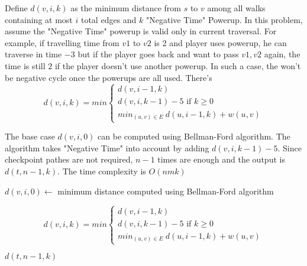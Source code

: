 \documentclass[12pt,a4paper]{article}
\begin{document}
Define $d(v,i,k)$ as the minimum distance from $s$ to $v$ among all walks containing at most $i$ total edges and $k$ "Negative Time" Powerup. In this problem, assume the "Negative Time" powerup is valid only in current traversal. For example, if travelling time from $v1$ to $v2$ is 2 and player uses powerup, he can traverse in time $-3$ but if the player goes back and want to pass $v1,v2$ again, the time is still $2$ if the player doesn't use another powerup. In such a case, the won't be negative cycle once the powerups are all used. There's
\begin{equation*}
	d(v,i,k) = min
	\begin{cases}
		d(v,i - 1,k) \\
		d(v,i,k - 1) - 5 \mbox{ if $k \ge 0$} \\
		min_{(u,v) \in E}\ d(u, i - 1, k) + w(u,v)
	\end{cases}
\end{equation*}

The base case $d(v,i,0)$ can be computed using Bellman-Ford algorithm. The algorithm takes "Negative Time" into account by adding $d(v,i,k - 1) - 5$. Since checkpoint pathes are not required, $n - 1$ times are enough and the output is $d(t,n - 1, k)$. The time complexity is $O(nmk)$

\begin{algorithm}
	\begin{algorithmic}
		\State $d(v,i,0) \gets$ minimum distance computed using Bellman-Ford algorithm
		\EndFor

\begin{equation*}
	d(v,i,k) = min
	\begin{cases}
		d(v,i - 1,k) \\
		d(v,i,k - 1) - 5 \mbox{ if $k \ge 0$} \\
		min_{(u,v) \in E}\ d(u, i - 1, k) + w(u,v)
	\end{cases}
\end{equation*}
		\EndFor
		\EndFor
		\EndFor

		\Return $d(t,n - 1, k)$
		\EndFunction
	\end{algorithmic}
\end{algorithm}
\end{document}
